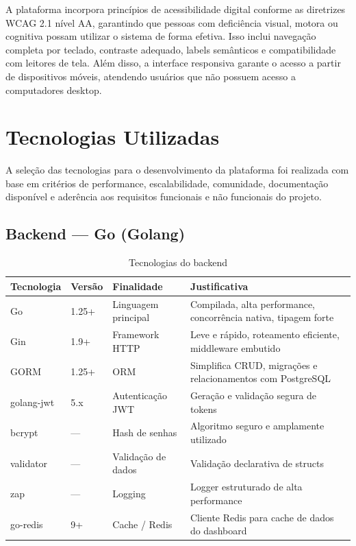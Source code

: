 \documentclass[a4paper,12pt,oneside]{article}
\begin{document}
A plataforma incorpora princípios de acessibilidade digital conforme as diretrizes WCAG 2.1 nível AA, garantindo que pessoas com deficiência visual, motora ou cognitiva possam utilizar o sistema de forma efetiva. Isso inclui navegação completa por teclado, contraste adequado, labels semânticos e compatibilidade com leitores de tela. Além disso, a interface responsiva garante o acesso a partir de dispositivos móveis, atendendo usuários que não possuem acesso a computadores desktop.

\section{Tecnologias Utilizadas}

A seleção das tecnologias para o desenvolvimento da plataforma foi realizada com base em critérios de performance, escalabilidade, comunidade, documentação disponível e aderência aos requisitos funcionais e não funcionais do projeto.

\subsection{Backend --- Go (Golang)}

\begin{table}[H]
\centering
\caption{Tecnologias do backend}
\label{tab:tech-backend}
\small
\begin{tabularx}{\textwidth}{l l X X}
\toprule
\textbf{Tecnologia} & \textbf{Versão} & \textbf{Finalidade} & \textbf{Justificativa} \\
\midrule
Go & 1.25+ & Linguagem principal & Compilada, alta performance, concorrência nativa, tipagem forte \\
Gin & 1.9+ & Framework HTTP & Leve e rápido, roteamento eficiente, middleware embutido \\
GORM & 1.25+ & ORM & Simplifica CRUD, migrações e relacionamentos com PostgreSQL \\
golang-jwt & 5.x & Autenticação JWT & Geração e validação segura de tokens \\
bcrypt & --- & Hash de senhas & Algoritmo seguro e amplamente utilizado \\
validator & --- & Validação de dados & Validação declarativa de structs \\
zap & --- & Logging & Logger estruturado de alta performance \\
go-redis & 9+ & Cache / Redis & Cliente Redis para cache de dados do dashboard \\
\bottomrule
\end{tabularx}
\end{table}
\end{document}
